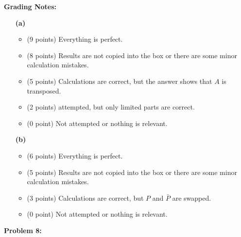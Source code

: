 \documentclass[letterpaper]{article}
\begin{document}
\noindent \textbf{Grading Notes:}
\begin{enumerate}
  \item[\bf (a)]
    \begin{itemize}
      \item (9 points) Everything is perfect.
      \item (8 points) Results are not copied into the box or there are some minor calculation mistakes.
      \item (5 points) Calculations are correct, but the answer shows that $A$ is transposed.
      \item (2 points) attempted, but only limited parts are correct.
      \item (0 point) Not attempted or nothing is relevant.
    \end{itemize}
  \item[\bf (b)]
    \begin{itemize}
      \item (6 points) Everything is perfect.
      \item (5 points) Results are not copied into the box or there are some minor calculation mistakes.
      \item (3 points) Calculations are correct, but $P$ and $\bar{P}$ are swapped.
      \item (0 point) Not attempted or nothing is relevant.
    \end{itemize}
\end{enumerate}


\newpage

\noindent \textbf{Problem 8:}
\end{document}
